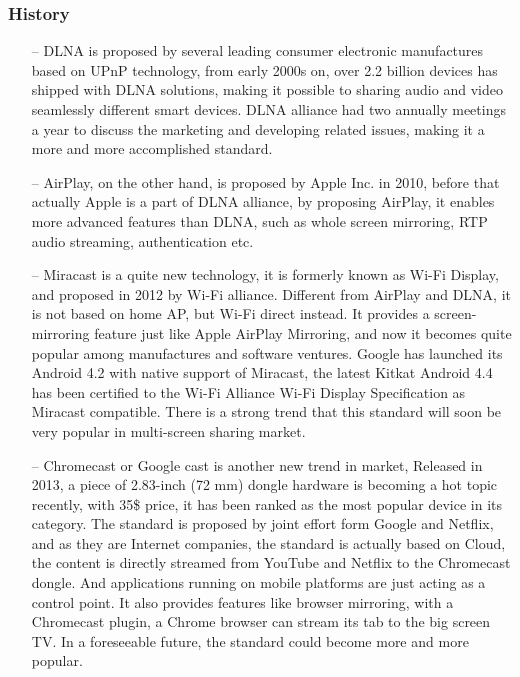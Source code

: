 \subsubsection{History} 
\begin{itemize} 
\item[--]DLNA is proposed by several leading consumer electronic manufactures based on UPnP 
technology, from early 2000s on, over 2.2 billion devices has shipped with DLNA solutions, 
making it possible to sharing audio and video seamlessly different smart devices. DLNA alliance 
had two annually meetings a year to discuss the marketing and developing related issues, making 
it a more and more accomplished standard. 

\item[--]AirPlay, on the other hand, is proposed by Apple Inc. in 2010, before that actually 
Apple is a part of DLNA alliance, by proposing AirPlay, it enables more advanced features than 
DLNA, such as whole screen mirroring, RTP audio streaming, authentication etc. 
\item[--]Miracast is a quite new technology, it is formerly known as Wi-Fi Display, and proposed 
in 2012 by Wi-Fi alliance. Different from AirPlay and DLNA, it is not based on home AP, but  
Wi-Fi direct instead. It provides a screen-mirroring feature just like Apple AirPlay Mirroring, 
and now it becomes quite popular among manufactures and software ventures. Google has launched 
its Android 4.2 with native support of Miracast, the latest Kitkat Android 4.4 has been certified 
to the Wi-Fi Alliance Wi-Fi Display Specification as Miracast compatible. There is a strong trend 
that this standard will soon be very popular in multi-screen sharing market. 
\item[--]Chromecast or Google cast is another new trend in 
market, Released in 2013, a piece of 2.83-inch (72 mm) dongle hardware is 
becoming a hot topic recently, with 35\$ price, it has been ranked as the most 
popular device in its category. The standard is proposed by joint effort form 
Google and Netflix, and as they are Internet companies, the standard is 
actually based on Cloud, the content is directly streamed from YouTube and 
Netflix to the Chromecast dongle. And applications running on mobile platforms 
are just acting as a control point. It also provides features like browser 
mirroring, with a Chromecast plugin, a Chrome browser can stream its tab to the 
big screen TV. In a foreseeable future, the standard could become more and more popular. 
\end{itemize} 
